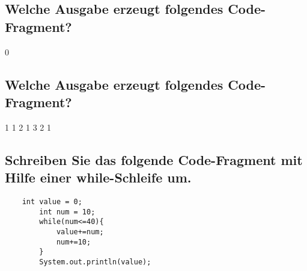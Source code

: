 \documentclass{article}
\begin{document}
\subsection{Welche Ausgabe erzeugt folgendes Code-Fragment?}
0\newline
\subsection{Welche Ausgabe erzeugt folgendes Code-Fragment?}
1 1 2 1 3 2 1\newline
\subsection{Schreiben Sie das folgende Code-Fragment mit Hilfe einer while-Schleife um.}
\begin{verbatim}
    int value = 0;
        int num = 10;
        while(num<=40){
            value+=num;
            num+=10;
        }
        System.out.println(value);
\end{verbatim}
\end{document}

